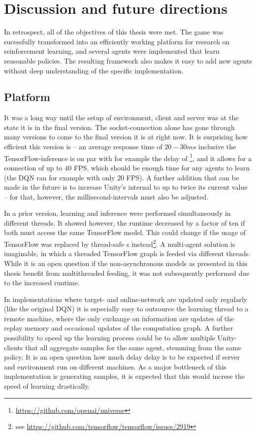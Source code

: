 \chapter{Discussion and future directions}

In retrospect, all of the objectives of this thesis were met. The game was sucessfully transformed into an efficiently working platform for research on reinforcement learning, and several agents were implemented that learn reasonable policies. The resulting framework also makes it easy to add new agents without deep understanding of the specific implementation.

\section{Platform}

It was a long way until the setup of environment, client and server was at the state it is in the final version. The socket-connection alone has gone through many versions to come to the final version it is at right now. It is surprising how efficient this version is -- an average response time of $20-30ms$ inclusive the TensorFlow-inference is on par with for example the delay of \footnote{\url{https://github.com/openai/universe}}, and it allows for a connection of up to $40$ FPS, which should be enough time for any agents to learn (the DQN ran for example with only $20$ FPS). A further addition that can be made in the future is to increase Unity's internal  to up to twice its current value -- for that, however, the millisecond-intervals must also be adjusted.

In a prior version, learning and inference were performed simultaneously in different threads. It showed however, the runtime decreased by a factor of ten if both must access the same TensorFlow model. This could change if the usage of TensorFlow  was  replaced by thread-safe s instead\footnote{see \url{https://github.com/tensorflow/tensorflow/issues/2919}}. A multi-agent solution is imaginable, in which a threaded TensorFlow graph is feeded via different threads. While it is an open question if the non-asynchronous models as presented in this thesis benefit from multithreaded feeding, it was not subsequently performed due to the increased runtime. 

In implementations where target- and online-network are updated only regularly (like the original DQN) it is especially easy to outsource the learning thread to a remote machine, where the only exchange on information are updates of the replay memory and occasional updates of the computation graph. A further possibility to speed up the learning process could be to allow multiple Unity-clients that all aggregate samples for the same agent, stemming from the same policy. It is an open question how much delay delay is to be expected if server and environment run on different machines. As a major bottleneck of this implementation is generating samples, it is expected that this would increse the speed of learning drastically.

